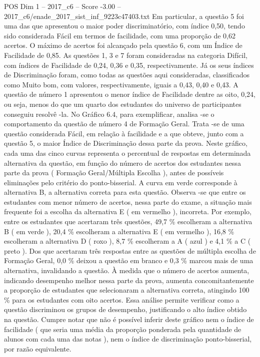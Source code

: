 \begin{textsample}{POS Dim 1 – 2017\_c6 – Score -3.00 – 2017\_c6/enade\_2017\_sist\_inf\_9223c47403.txt}
Em particular, a questão 5 foi uma das que apresentou o maior poder discriminatório, com índice 0,50, tendo sido considerada Fácil em termos de facilidade, com uma proporção de 0,62 acertos.
O máximo de acertos foi alcançado pela questão 6, com um Índice de Facilidade de 0,85.
As questões 1, 3 e 7 foram consideradas na categoria Difícil, com índices de Facilidade de 0,24, 0,36 e 0,35, respectivamente.
Já os seus índices de Discriminação foram, como todas as questões aqui consideradas, classificados como Muito bom, com valores, respectivamente, iguais a 0,43, 0,40 e 0,43.
A questão de número 1 apresentou o menor índice de Facilidade dentre as oito, 0,24, ou seja, menos do que um quarto dos estudantes do universo de participantes conseguiu resolvê -la.
No Gráfico 6.4, para exemplificar, analisa -se o comportamento da questão de número 4 de Formação Geral.
Trata -se de uma questão considerada Fácil, em relação à facilidade e a que obteve, junto com a questão 5, o maior Índice de Discriminação dessa parte da prova.
Neste gráfico, cada uma das cinco curvas representa o percentual de respostas em determinada alternativa da questão, em função do número de acertos dos estudantes nessa parte da prova ( Formação Geral/Múltipla Escolha ), antes de possíveis eliminações pelo critério do ponto-bisserial.
A curva em verde corresponde à alternativa B, a alternativa correta para esta questão.
Observa -se que entre os estudantes com menor número de acertos, nessa parte do exame, a situação mais frequente foi a escolha da alternativa E ( em vermelho ), incorreta.
Por exemplo, entre os estudantes que acertaram três questões, 49,7 \% escolheram a alternativa B ( em verde ), 20,4 \% escolheram a alternativa E ( em vermelho ), 16,8 \% escolheram a alternativa D ( roxo ), 8,7 \% escolheram a A ( azul ) e 4,1 \% a C ( preto ).
Dos que acertaram três respostas entre as questões de múltipla escolha de Formação Geral, 0,0 \% deixou a questão em branco e 0,3 \% marcou mais de uma alternativa, invalidando a questão.
À medida que o número de acertos aumenta, indicando desempenho melhor nessa parte da prova, aumenta concomitantemente a proporção de estudantes que selecionaram a alternativa correta, atingindo 100 \% para os estudantes com oito acertos.
Essa análise permite verificar como a questão discriminou os grupos de desempenho, justificando o alto índice obtido na questão.
Cumpre notar que não é possível inferir deste gráfico nem o índice de facilidade ( que seria uma média da proporção ponderada pela quantidade de alunos com cada uma das notas ), nem o índice de discriminação ponto-bisserial, por razão equivalente.

\end{textsample}
